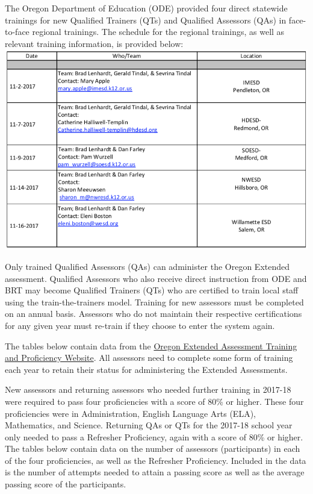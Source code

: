 \documentclass[]{article}
\begin{document}
The Oregon Department of Education (ODE) provided four direct statewide
trainings for new Qualified Trainers (QTs) and Qualified Assessors (QAs)
in face-to-face regional trainings. The schedule for the regional
trainings, as well as relevant training information, is provided below:
\FloatBarrier
\includegraphics{Figures/TrainingSched/TraingSched.png}

Only trained Qualified Assessors (QAs) can administer the Oregon
Extended assessment. Qualified Assessors who also receive direct
instruction from ODE and BRT may become Qualified Trainers (QTs) who are
certified to train local staff using the train-the-trainers model.
Training for new assessors must be completed on an annual basis.
Assessors who do not maintain their respective certifications for any
given year must re-train if they choose to enter the system again.

The tables below contain data from the
\color{link}\href{http://or.k12test.com/}{Oregon Extended Assessment
Training and Proficiency Website}\color{black}. All assessors need to
complete some form of training each year to retain their status for
administering the Extended Assessments.

New assessors and returning assessors who needed further training in
2017-18 were required to pass four proficiencies with a score of 80\% or
higher. These four proficiencies were in Administration, English
Language Arts (ELA), Mathematics, and Science. Returning QAs or QTs for
the 2017-18 school year only needed to pass a Refresher Proficiency,
again with a score of 80\% or higher. The tables below contain data on
the number of assessors (participants) in each of the four
proficiencies, as well as the Refresher Proficiency. Included in the
data is the number of attempts needed to attain a passing score as well
as the average passing score of the participants.
\end{document}
